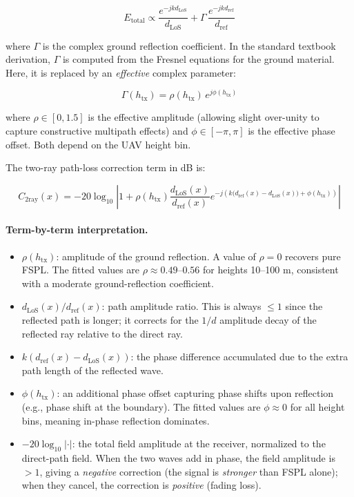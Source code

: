 \documentclass[11pt,a4paper]{article}
\begin{document}
\begin{equation}
E_{\mathrm{total}}
\propto
\frac{e^{-jkd_{\mathrm{LoS}}}}{d_{\mathrm{LoS}}}
+
\Gamma\,\frac{e^{-jkd_{\mathrm{ref}}}}{d_{\mathrm{ref}}}
\label{eq:field_sum}
\end{equation}

where $\Gamma$ is the complex ground reflection coefficient. In the standard
textbook derivation, $\Gamma$ is computed from the Fresnel equations for the
ground material. Here, it is replaced by an \emph{effective} complex
parameter:

\begin{equation}
\Gamma(h_{\mathrm{tx}})
=
\rho(h_{\mathrm{tx}})\,e^{j\phi(h_{\mathrm{tx}})}
\end{equation}

where $\rho \in [0, 1.5]$ is the effective amplitude (allowing slight
over-unity to capture constructive multipath effects) and $\phi \in [-\pi,
\pi]$ is the effective phase offset. Both depend on the UAV height bin.

The two-ray path-loss correction term in dB is:

\begin{equation}
C_{\mathrm{2ray}}(x)
=
-20 \log_{10}
\left|
1 + \rho(h_{\mathrm{tx}})
\frac{d_{\mathrm{LoS}}(x)}{d_{\mathrm{ref}}(x)}
e^{-j\left(k\bigl(d_{\mathrm{ref}}(x)-d_{\mathrm{LoS}}(x)\bigr)+\phi(h_{\mathrm{tx}})\right)}
\right|
\label{eq:c2ray}
\end{equation}

\paragraph{Term-by-term interpretation.}
\begin{itemize}
\item $\rho(h_{\mathrm{tx}})$: amplitude of the ground reflection. A value of
      $\rho = 0$ recovers pure FSPL. The fitted values are $\rho \approx
      0.49$--$0.56$ for heights 10--100 m, consistent with a moderate
      ground-reflection coefficient.
\item $d_{\mathrm{LoS}}(x)/d_{\mathrm{ref}}(x)$: path amplitude ratio. This
      is always $\le 1$ since the reflected path is longer; it corrects for
      the $1/d$ amplitude decay of the reflected ray relative to the direct
      ray.
\item $k(d_{\mathrm{ref}}(x) - d_{\mathrm{LoS}}(x))$: the phase difference
      accumulated due to the extra path length of the reflected wave.
\item $\phi(h_{\mathrm{tx}})$: an additional phase offset capturing phase
      shifts upon reflection (e.g., phase shift at the boundary). The fitted
      values are $\phi \approx 0$ for all height bins, meaning in-phase
      reflection dominates.
\item $-20\log_{10}|\cdot|$: the total field amplitude at the receiver,
      normalized to the direct-path field. When the two waves add in phase, the
      field amplitude is $> 1$, giving a \emph{negative} correction (the signal
      is \emph{stronger} than FSPL alone); when they cancel, the correction is
      \emph{positive} (fading loss).
\end{itemize}
\end{document}
